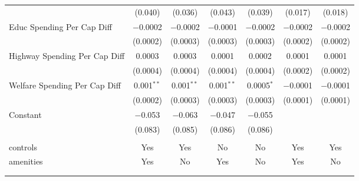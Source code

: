 \begin{table}[!htbp]
\begin{tabular}{@{\extracolsep{5pt}}lcccccc}
  & (0.040) & (0.036) & (0.043) & (0.039) & (0.017) & (0.018) \\ 
  Educ Spending Per Cap Diff & $-$0.0002 & $-$0.0002 & $-$0.0001 & $-$0.0002 & $-$0.0002 & $-$0.0002 \\ 
  & (0.0002) & (0.0003) & (0.0003) & (0.0003) & (0.0002) & (0.0002) \\ 
  Highway Spending Per Cap Diff & 0.0003 & 0.0003 & 0.0001 & 0.0002 & 0.0001 & 0.0001 \\ 
  & (0.0004) & (0.0004) & (0.0004) & (0.0004) & (0.0002) & (0.0002) \\ 
  Welfare Spending Per Cap Diff & 0.001$^{**}$ & 0.001$^{**}$ & 0.001$^{**}$ & 0.0005$^{*}$ & $-$0.0001 & $-$0.0001 \\ 
  & (0.0002) & (0.0003) & (0.0003) & (0.0003) & (0.0001) & (0.0001) \\ 
  Constant & $-$0.053 & $-$0.063 & $-$0.047 & $-$0.055 &  &  \\ 
  & (0.083) & (0.085) & (0.086) & (0.086) &  &  \\ 
 \hline \\[-1.8ex] 
controls & Yes & Yes & No & No & Yes & Yes \\ 
amenities & Yes & No & Yes & No & Yes & No \\ 
\hline \\[-1.8ex] 
\hline 
\hline \\[-1.8ex] 
\end{tabular} 
\end{table} 

